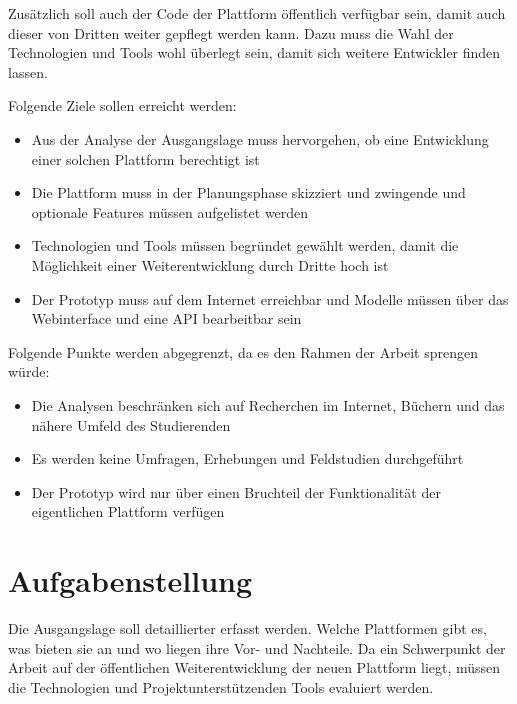 \documentclass[]{scrreprt}
\begin{document}
    Zusätzlich soll auch der Code der Plattform öffentlich verfügbar sein, 
    damit auch dieser von Dritten weiter gepflegt werden kann. Dazu muss die 
    Wahl der Technologien und Tools wohl überlegt sein, damit sich weitere 
    Entwickler finden lassen.
    
    Folgende Ziele sollen erreicht werden:
    
    \begin{itemize}
        \item Aus der Analyse der Ausgangslage muss hervorgehen, ob eine
            Entwicklung einer solchen Plattform berechtigt ist
        \item Die Plattform muss in der Planungsphase skizziert und
            zwingende und optionale Features müssen aufgelistet werden
        \item Technologien und Tools müssen begründet gewählt werden, damit 
            die Möglichkeit einer Weiterentwicklung durch Dritte hoch ist
        \item Der Prototyp muss auf dem Internet erreichbar und Modelle
            müssen über das Webinterface und eine API bearbeitbar sein
    \end{itemize}
    
    Folgende Punkte werden abgegrenzt, da es den Rahmen der Arbeit sprengen 
    würde:
    
    \begin{itemize}
        \item Die Analysen beschränken sich auf Recherchen im Internet, 
            Büchern und das nähere Umfeld des Studierenden
        \item Es werden keine Umfragen, Erhebungen und Feldstudien 
            durchgeführt
        \item Der Prototyp wird nur über einen Bruchteil der Funktionalität 
            der eigentlichen Plattform verfügen
    \end{itemize}

    \section{Aufgabenstellung}
    Die Ausgangslage soll detaillierter erfasst werden. Welche Plattformen
    gibt es, was bieten sie an und wo liegen ihre Vor- und Nachteile.
    Da ein Schwerpunkt der Arbeit auf der öffentlichen Weiterentwicklung der
    neuen Plattform liegt, müssen die Technologien und Projektunterstützenden 
    Tools evaluiert werden.
    
\end{document}
